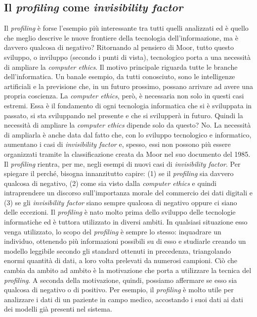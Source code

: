 \subsection*{Il \textit{profiling} come \textit{invisibility factor}}

Il \textit{profiling} è forse l’esempio più interessante tra tutti quelli analizzati ed è quello che meglio descrive le nuove frontiere della tecnologia dell’informazione, ma è davvero qualcosa di negativo?
Ritornando al pensiero di Moor, tutto questo sviluppo, o inviluppo (secondo i punti di vista), tecnologico porta a una necessità di ampliare la \textit{computer ethics}. Il motivo principale riguarda tutte le branche dell’informatica. Un banale esempio, da tutti conosciuto, sono le intelligenze artificiali e la previsione che, in un futuro prossimo, possano arrivare ad avere una propria coscienza. La \textit{computer ethics}, però, è necessaria non solo in questi casi estremi. Essa è il fondamento di ogni tecnologia informatica che si è sviluppata in passato, si sta sviluppando nel presente e che si svilupperà in futuro. Quindi la necessità di ampliare la \textit{computer ethics} dipende solo da questo? No. La necessità di ampliarla è anche data dal fatto che, con lo sviluppo tecnologico e informatico, aumentano i casi di \textit{invisibility factor} e, spesso, essi non possono più essere organizzati tramite la classificazione creata da Moor nel suo documento del 1985.
Il \textit{profiling} rientra, per me, negli esempi di nuovi casi di \textit{invisibility factor}. 
Per spiegare il perché, bisogna innanzitutto capire: (1) se il \textit{profiling} sia davvero qualcosa di negativo, (2) come sia visto dalla \textit{computer ethics} e quindi intraprendere un discorso sull’importanza morale del commercio dei dati digitali e (3) se gli \textit{invisibility factor} siano sempre qualcosa di negativo oppure ci siano delle eccezioni.
Il \textit{profiling} è nato molto prima dello sviluppo delle tecnologie informatiche ed è tuttora utilizzato in diversi ambiti. In qualsiasi situazione esso venga utilizzato, lo scopo del \textit{profiling} è sempre lo stesso: inquadrare un individuo, ottenendo più informazioni possibili su di esso e studiarle creando un modello leggibile secondo gli standard ottenuti in precedenza, triangolando enormi quantità di dati, a loro volta prelevati da numerosi campioni.
Ciò che cambia da ambito ad ambito è la motivazione che porta a utilizzare la tecnica del \textit{profiling}. A seconda della motivazione, quindi, possiamo affermare se esso sia qualcosa di negativo o di positivo. Per esempio, il \textit{profiling} è molto utile per analizzare i dati di un paziente in campo medico, accostando i suoi dati ai dati dei modelli già presenti nel sistema.
